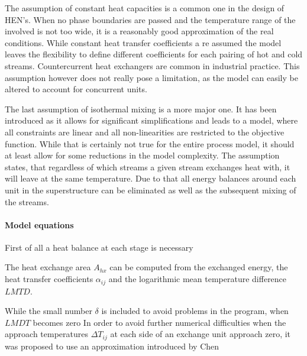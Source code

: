     The assumption of constant heat capacities is a common one in the design of HEN's. When no phase boundaries are passed
    and the temperature range of the involved is not too wide, it is a reasonably good approximation of the real conditions.
    While constant heat transfer coefficients a re assumed the model leaves the flexibility to define different
    coefficients for each pairing of hot and cold streams. Countercurrent heat exchangers are common in industrial practice.
    This assumption however does not really pose a limitation, as the model can easily be altered to account for concurrent
    units.

    The last assumption of isothermal mixing is a more major one. It has been introduced as it allows for significant
    simplifications and leads to a model, where all constraints are linear and all non-linearities are restricted
    to the objective function. While that is certainly not true for the entire process model, it should at least
    allow for some reductions in the model complexity. The assumption states, that regardless of which streams a
    given stream exchanges heat with, it will leave at the same temperature. Due to that all energy balances around
    each unit in the superstructure can be eliminated as well as the subsequent mixing of the streams.

    \paragraph{Model equations}

    First of all a heat balance at each stage is necessary

    The heat exchange area $A_{hx}$ can be computed from the exchanged energy, the heat transfer coefficients $\alpha_{ij}$
    and the logarithmic mean temperature difference $LMTD$.

    While the small number $\delta$ is included to avoid problems in the program, when $LMDT$ becomes zero
    In order to avoid further numerical difficulties when the approach temperatures $\Delta T_{ij}$ at each side of an exchange
    unit approach zero, it was proposed to use an approximation introduced by Chen \cite{Chen.1987}


